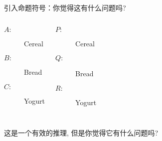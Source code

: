 \begin{frame}{}
  引入命题符号：你觉得这有什么问题吗?
  \begin{columns}
      \begin{description}
	\item[$A:$] Cereal
	\item[$B:$] Bread
	\item[$C:$] Yogurt
      \end{description}
      \begin{description}
	\item[$P:$] Cereal
	\item[$Q:$] Bread
	\item[$R:$] Yogurt
      \end{description}
  \end{columns}

  \vspace{0.30cm}
  \pause
\end{frame}

\begin{frame}{}
  这是一个有效的推理, 但是你觉得它有什么问题吗?
  
\end{frame}

\begin{frame}{}
  \begin{quote}
    \centerline{}
  \end{quote}
\end{frame}

